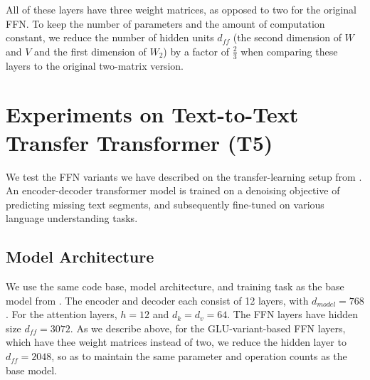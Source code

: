 \documentclass{article}
\begin{document}
All of these layers have three weight matrices, as opposed to two for the original FFN.  To keep the number of parameters and the amount of computation constant, we reduce the number of hidden units $d_{ff}$ (the second dimension of $W$ and $V$ and the first dimension of $W_2$) by a factor of $\frac{2}{3}$ when comparing these layers to the original two-matrix version.

\section{Experiments on Text-to-Text Transfer Transformer (T5)}

We test the FFN variants we have described on the transfer-learning setup from \citep{raffel2019exploring}.  An encoder-decoder transformer model \citep{Vas17} is trained on a denoising objective of predicting missing text segments, and subsequently fine-tuned on various language understanding tasks.  

\subsection{Model Architecture}

We use the same code base, model architecture, and training task as the base model from \citep{raffel2019exploring}.  The encoder and decoder each consist of 12 layers, with $d_{model}=768$.  For the attention layers,  $h=12$ and $d_k = d_v = 64$.   The FFN layers have hidden size $d_{ff}=3072$.  As we describe above, for the GLU-variant-based FFN layers, which have thee weight matrices instead of two, we reduce the hidden layer to $d_{ff}=2048$, so as to maintain the same parameter and operation counts as the base model.

\begin{table}[h]
\caption{Heldout-set log-perplexity for Transformer models on the segment-filling task from \citep{raffel2019exploring}.  All models are matched for parameters and computation.}
\label{tab:ppl}
\begin{center}
\vspace{-2mm}
\end{center}
\end{table}
\end{document}
